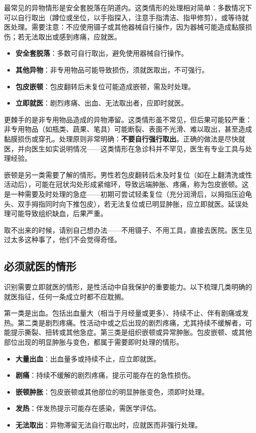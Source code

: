 \documentclass[12pt,UTF8]{ctexbook}
\newcommand{\keyword}[1]{\textbf{#1}}
\begin{document}
最常见的异物情形是安全套脱落在阴道内。这类情形的处理相对简单：多数情况下可以自行取出（蹲位或坐位，以手指探入，注意手指清洁、指甲修剪），或等待就医处理。需要注意：不应使用镊子或其他器械自行操作，因为器械可能造成黏膜损伤；若无法取出或感到疼痛，应就医。

\begin{itemize}
  \item \keyword{安全套脱落}：多数可自行取出，避免使用器械自行操作。
  \item \keyword{其他异物}：非专用物品可能导致损伤，须就医取出，不可强行。
  \item \keyword{包皮嵌顿}：包皮翻转后未复位可能造成嵌顿，需及时处理。
  \item \keyword{立即就医}：剧烈疼痛、出血、无法取出者，应即时就医。
\end{itemize}

更棘手的是非专用物品造成的异物滞留。这类情形虽不常见，但后果可能较严重：非专用物品（如瓶类、蔬果、笔具）可能断裂、表面不光滑、难以取出，甚至造成黏膜损伤或穿孔。处理原则非常明确：\keyword{不要自行强行取出}。正确的做法是尽快就医，并向医生如实说明情况——这类情形在急诊科并不罕见，医生有专业工具与处理经验。

嵌顿是另一类需要了解的情形。男性若包皮翻转后未及时复位（如在上翻清洗或性活动后），可能在冠状沟处形成紧缩环，导致远端肿胀、疼痛，称为包皮嵌顿。这是一种需要及时处理的急症——初期可尝试轻柔复位（充分润滑后，以拇指压迫龟头、双手拇指同时向下推包皮），若无法复位或已明显肿胀，应立即就医。延误处理可能导致组织缺血，后果严重。

\begin{tcolorbox}[colback=pink!5!white,colframe=red!50!black,title=贴心小叮咛]
取不出来的时候，请别自己想办法——不用镊子、不用工具，直接去医院。医生见过太多这种事了，他们不会觉得奇怪。
\end{tcolorbox}
\subsection{必须就医的情形}

识别需要立即就医的情形，是性活动中自我保护的重要能力。以下梳理几类明确的就医指征，任何一条成立时都不应耽搁。

第一类是出血。包括出血量大（相当于月经量或更多）、持续不止、伴有剧痛或发热。第二类是剧烈疼痛。性活动中或之后出现的剧烈疼痛，尤其持续不缓解者，可能提示撕裂、扭转或其他急症。第三类是组织嵌顿或异常肿胀。包皮嵌顿、或其他部位出现的明显肿胀与变色，都属于需要即时处理的情形。

\begin{itemize}
  \item \keyword{大量出血}：出血量多或持续不止，应立即就医。
  \item \keyword{剧痛}：持续不缓解的剧烈疼痛，提示可能存在的急性损伤。
  \item \keyword{嵌顿肿胀}：包皮嵌顿或其他部位的明显肿胀变色，须即时处理。
  \item \keyword{发热}：伴发热提示可能存在感染，需医学评估。
  \item \keyword{无法取出}：异物滞留无法自行取出时，应就医而非强行处理。
\end{itemize}
\end{document}
